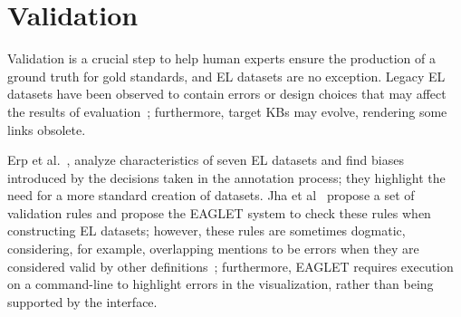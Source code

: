 \documentclass[sigconf]{acmart}
\begin{document}
\section{Validation}

Validation is a crucial step to help human experts ensure the production of a ground truth for gold standards, and EL datasets are no exception. Legacy EL datasets have been observed to contain errors or design choices that may affect the results of evaluation~\cite{Marieke2016,Kunal2017,ourAMW2018}; furthermore, target KBs may evolve, rendering some links obsolete. 

Erp et al.~\cite{Marieke2016}, analyze characteristics of seven EL datasets and find biases introduced by the decisions taken in the annotation process; they highlight the need for a more standard creation of datasets. Jha et al~\cite{Kunal2017} propose a set of validation rules and propose the EAGLET system to check these rules when constructing EL datasets; however, these rules are sometimes dogmatic, considering, for example, overlapping mentions to be errors when they are considered valid by other definitions~\cite{ourAMW2018}; furthermore, EAGLET requires execution on a command-line to highlight errors in the visualization, rather than being supported by the interface.



\end{document}
